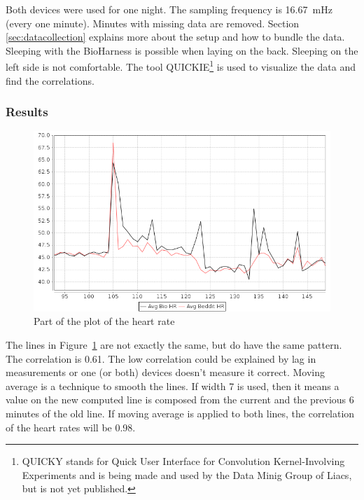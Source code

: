 			Both devices were used for one night. The sampling frequency is \SI{16.67}{\milli\hertz} (every one minute). Minutes with missing data are removed. Section \ref{sec:datacollection} explains more about the setup and how to bundle the data. Sleeping with the BioHarness is possible when laying on the back. Sleeping on the left side is not comfortable. The tool QUICKIE\footnote{QUICKY stands for Quick User Interface for Convolution Kernel-Involving Experiments and is being made and used by the Data Minig Group of Liacs, but is not yet published.} is used to visualize the data and find the correlations.

		\subsubsection{Results}
			
			\begin{figure}[h]
				\centering
					\includegraphics[scale=0.5]{avgbiovsavgbeddit.png}
					
				\caption{Part of the plot of the heart rate}
				\label{fig:avgbiovsavgbeddit}

			\end{figure}

			The lines in Figure~\ref{fig:avgbiovsavgbeddit} are not exactly the same, but do have the same pattern. The correlation is 0.61. The low correlation could be explained by lag in measurements or one (or both) devices doesn't measure it correct. Moving average is a technique to smooth the lines. If width 7 is used, then it means a value on the new computed line is composed from the current and the previous 6 minutes of the old line. If moving average is applied to both lines, the correlation of the heart rates will be 0.98.\
						
